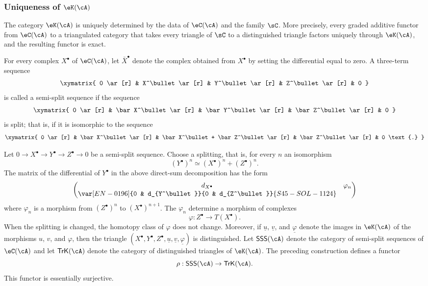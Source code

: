 \subsubsection{Uniqueness of $\eK(\cA)$}\label{VIII:1-2-4}

The category $\eK(\cA)$ is uniquely determined by the data of $\eC(\cA)$
and the family $\sC$. More precisely, every graded additive functor from
$\eC(\cA)$ to a triangulated category that takes every triangle of $\sC$
to a distinguished triangle factors uniquely through $\eK(\cA)$, and the
resulting functor is exact.

For every complex $X^\bullet$ of $\eC(\cA)$, let $\bar X^\bullet$ denote
the complex obtained from $X^\bullet$ by setting the differential equal
to zero. A three-term sequence
\[\xymatrix{
  0 \ar[r]
    & X^\bullet \ar[r]
    & Y^\bullet \ar[r]
    & Z^\bullet \ar[r]
    & 0
}\]
is called a semi-split sequence if the sequence
\[\xymatrix{
  0 \ar[r]
    & \bar X^\bullet \ar[r]
    & \bar Y^\bullet \ar[r]
    & \bar Z^\bullet \ar[r]
    & 0
}\]
is split; that is, if it is isomorphic to the sequence
\[\xymatrix{
  0 \ar[r]
    & \bar X^\bullet \ar[r]
    & \bar X^\bullet + \bar Z^\bullet \ar[r]
    & \bar Z^\bullet \ar[r]
    & 0 \text{.}
}\]

Let $0 \to X^\bullet \to Y^\bullet \to Z^\bullet \to 0$ be a semi-split
sequence. Choose a splitting, that is, for every $n$ an isomorphism
\[
  (Y^\bullet)^n \simeq (X^\bullet)^n + (Z^\bullet)^n \text{.}
\]
The matrix of the differential of $Y^\bullet$ in the above direct-sum
decomposition has the form
\[
  \begin{pmatrix}
    d_{X^\bullet} & \varphi_n \\
    \var[EN-0196]{0 & d_{Y^\bullet}}{0 & d_{Z^\bullet}}{S45-SOL-1124}
  \end{pmatrix}
\]
where $\varphi_n$ is a morphism from $(Z^\bullet)^n$ to
$(X^\bullet)^{n+1}$. The $\varphi_n$ determine a morphism of complexes
\[
  \varphi:Z^\bullet \to T(X^\bullet) \text{.}
\]
When the splitting is changed, the homotopy class of $\varphi$ does not
change. Moreover, if $\underline u$, $\underline v$, and
$\underline\varphi$ denote the images in $\eK(\cA)$ of the morphisms $u$,
$v$, and $\varphi$, then the triangle
$(X^\bullet,Y^\bullet,Z^\bullet,\underline u,\underline v,\underline\varphi)$
is distinguished. Let $\mathsf{SSS}(\cA)$ denote the category of
semi-split sequences of $\eC(\cA)$ and let $\mathsf{TrK}(\cA)$ denote the
category of distinguished triangles of $\eK(\cA)$. The preceding
construction defines a functor
\[
  \rho:\mathsf{SSS}(\cA) \to \mathsf{TrK}(\cA) \text{.}
\]
This functor is essentially surjective.

